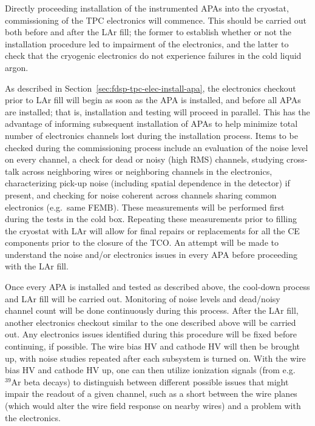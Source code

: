Directly proceeding installation of the instrumented APAs into the cryostat, commissioning of the
TPC electronics will commence.  This should be carried out both before and after the LAr fill;
the former to establish whether or not the installation procedure led to impairment of the
electronics, and the latter to check that the cryogenic electronics do not experience failures
in the cold liquid argon.

As described in Section~\ref{sec:fdsp-tpc-elec-install-apa}, the electronics checkout prior to
LAr fill will begin as soon as the APA is installed, and before all APAs are installed; that is,
installation and testing will proceed in parallel.  This has the advantage of informing
subsequent installation of APAs to help minimize total number of electronics channels lost
during the installation process.  Items to be checked during the commissioning process include
an evaluation of the noise level on every channel, a check for dead or noisy (high RMS) channels,
studying cross-talk across neighboring wires or neighboring channels in the electronics,
characterizing pick-up noise (including spatial dependence in the detector) if present, and
checking for noise coherent across channels sharing common electronics (e.g.~same FEMB).
These measurements will be performed first during the tests in the cold box.  Repeating these
measurements prior to filling the cryostat with LAr will allow for final repairs or replacements
for all the CE components prior to the closure of the TCO.  An attempt will be made to understand
the noise and/or electronics issues in every APA before proceeding with the LAr fill.

Once every APA is installed and tested as described above, the cool-down process and LAr fill
will be carried out.  Monitoring of noise levels and dead/noisy channel count will be
done continuously during this process.  After the LAr fill, another electronics checkout
similar to the one described above will be carried out.  Any electronics issues identified
during this procedure will be fixed before continuing, if possible.  The wire bias HV and
cathode HV will then be brought up, with noise studies repeated after each subsystem is
turned on.  With the wire bias HV and cathode HV up, one can then utilize ionization signals
(from e.g.~$\mathrm{{}^{39}Ar}$ beta decays) to distinguish between different possible issues
that might impair the readout of a given channel, such as a short between the wire planes
(which would alter the wire field response on nearby wires) and a problem with the electronics.

